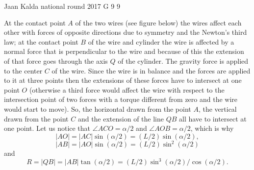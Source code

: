 \documentclass[11pt]{article}
\begin{document}
{Jaan Kalda} %
{national round} %
{2017} %
{G 9} %
{9} %
{

\ifEngSolution
At the contact point $A$ of the two wires (see figure below) the wires affect each other with forces of opposite directions due to symmetry and the Newton’s third law; at the contact point $B$ of the wire and cylinder the wire is affected by a normal force that is perpendicular to the wire and because of this the extension of that force goes through the axis $Q$ of the cylinder. The gravity force is applied to the center $C$ of the wire. Since the wire is in balance and the forces are applied to it at three points then the extensions of these forces have to intersect at one point $O$ (otherwise a third force would affect the wire with respect to the intersection point of two forces with a torque different from zero and the wire would start to move). So, the horizontal drawn from the point $A$, the vertical drawn from the point $C$ and the extension of the line $QB$ all have to intersect at one point. Let us notice that $\angle ACO=\alpha/2$ and $\angle AOB=\alpha/2$, which is why
$$|AO|=|AC|\sin(\alpha/2)=(L/2)\sin(\alpha/2),$$
$$|AB|=|AO|\sin(\alpha/2)=(L/2)\sin^2(\alpha/2)$$
and
$$R=|QB|=|AB|\tan(\alpha/2)=(L/2)\sin^3(\alpha/2)/\cos(\alpha/2).$$
\begin{center}
\end{center}

}
\end{document}
